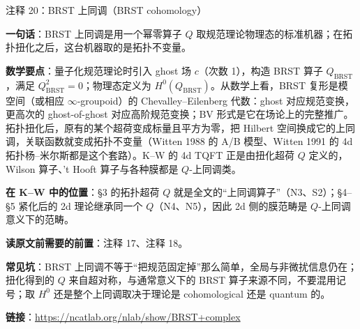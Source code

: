 \begin{kcard}{注释 20：BRST 上同调（BRST cohomology）}

\textbf{一句话}：BRST 上同调是用一个幂零算子 $Q$ 取规范理论物理态的标准机器；在拓扑扭化之后，这台机器取的是拓扑不变量。

\textbf{数学要点}：量子化规范理论时引入 ghost 场 $c$（次数 1），构造 BRST 算子 $Q_{\mathrm{BRST}}$，满足 $Q_{\mathrm{BRST}}^2=0$；物理态定义为 $H^0(Q_{\mathrm{BRST}})$。从数学上看，BRST 复形是模空间（或相应 $\infty$-groupoid）的 Chevalley--Eilenberg 代数：ghost 对应规范变换，更高次的 ghost-of-ghost 对应高阶规范变换；BV 形式是它在场论上的完整推广。拓扑扭化后，原有的某个超荷变成标量且平方为零，把 Hilbert 空间换成它的上同调，关联函数就变成拓扑不变量（Witten 1988 的 A/B 模型、Witten 1991 的 4d 拓扑杨--米尔斯都是这个套路）。K--W 的 4d TQFT 正是由扭化超荷 $Q$ 定义的，Wilson 算子、't Hooft 算子与各种膜都是 $Q$-上同调类。

\textbf{在 K--W 中的位置}：§3 的拓扑超荷 $Q$ 就是全文的“上同调算子”（N3、S2）；§4--§5 紧化后的 2d 理论继承同一个 $Q$（N4、N5），因此 2d 侧的膜范畴是 $Q$-上同调意义下的范畴。

\textbf{读原文前需要的前置}：注释 17、注释 18。

\textbf{常见坑}：BRST 上同调不等于“把规范固定掉”那么简单，全局与非微扰信息仍在；扭化得到的 $Q$ 来自超对称，与通常意义下的 BRST 算子来源不同，不要混用记号；取 $H^0$ 还是整个上同调取决于理论是 cohomological 还是 quantum 的。

\noindent\textbf{链接}：\url{https://ncatlab.org/nlab/show/BRST+complex}
\end{kcard}

